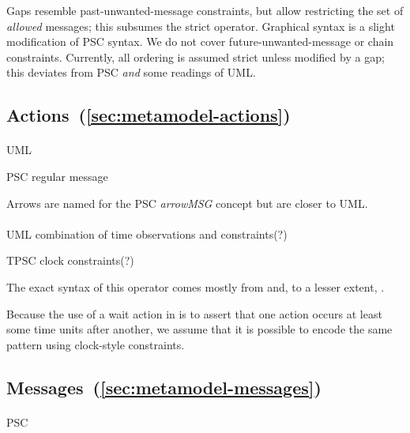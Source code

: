 Gaps resemble past-unwanted-message constraints, but
allow restricting the set of \emph{allowed} messages;
this subsumes the strict operator.  Graphical syntax is a slight
modification of PSC syntax.  We do not cover
future-unwanted-message or chain constraints.  Currently, all
ordering is assumed strict unless modified by a gap; this
deviates from PSC \emph{and} some readings of UML.
    
\subsection{Actions~(\ref{sec:metamodel-actions})}

\paragraph{\marrowaction}
\begin{featset}
\item[UML] 
\item[PSC] regular message
\end{featset}

Arrows are named for the PSC \emph{arrowMSG} concept but are closer
to UML.
      
\paragraph{\mwaitaction}
\begin{featset}
\item[UML] combination of time observations and constraints(?)
\item[TPSC] clock constraints(?)
\end{featset}

The exact syntax of this operator comes mostly from \robochart{} and, to
a lesser extent, \tockcsp.

Because the use of a wait action in \langname{} is to assert that one
action occurs at least some time units after another, we assume that it is
possible to encode the same pattern using clock-style constraints.

\subsection{Messages~(\ref{sec:metamodel-messages})}

\paragraph{\mmessageset}
\begin{featset}
\item[PSC] 
\end{featset}

